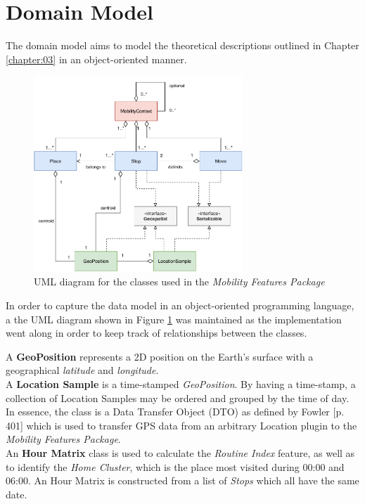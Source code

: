 \clearpage
\section{Domain Model}
The domain model aims to model the theoretical descriptions outlined in Chapter \ref{chapter:03} in an object-oriented manner.

\begin{figure}[h]
    \centering
    \includegraphics[width=0.7\textwidth]{images/diagrams/data-model-diagram.pdf}
    \caption{UML diagram for the classes used in the \textit{Mobility Features Package}}
    \label{fig:uml-diagram}
\end{figure}

In order to capture the data model in an object-oriented programming language, a the UML diagram shown in Figure \ref{fig:uml-diagram} was maintained as the implementation went along in order to keep track of relationships between the classes. 

A \textbf{GeoPosition} represents a 2D position on the Earth's surface with a geographical \textit{latitude} and \textit{longitude}.\\

A \textbf{Location Sample} is a time-stamped \textit{GeoPosition}. By having a time-stamp, a collection of Location Samples may be ordered and grouped by the time of day. In essence, the class is a Data Transfer Object (DTO) as defined by Fowler \cite{fowler-PEEA} [p. 401] which is used to transfer GPS data from an arbitrary Location plugin to the \textit{Mobility Features Package}.\\

An \textbf{Hour Matrix} class is used to calculate the \textit{Routine Index} feature, as well as to identify the \textit{Home Cluster}, which is the place most visited during 00:00 and 06:00. An Hour Matrix is constructed from a list of \textit{Stops} which all have the same date.\\

